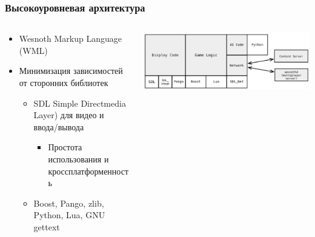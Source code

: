 \documentclass[xetex,mathserif,serif]{beamer}
\begin{document}
	\begin{frame}
		\frametitle{Высокоуровневая архитектура}
		\begin{columns}
			\begin{column}{0.6\textwidth}
				\begin{itemize}
					\item Wesnoth Markup Language (WML)
					\item Минимизация зависимостей от сторонних библиотек
					\begin{itemize}
						\item SDL Simple Directmedia Layer) для видео и ввода/вывода
						\begin{itemize}
							\item Простота использования и кроссплатформенность
						\end{itemize}
						\item Boost, Pango, zlib, Python, Lua, GNU gettext
					\end{itemize}
				\end{itemize}
			\end{column}
			\begin{column}{0.4\textwidth}
				\includegraphics[width=\textwidth]{wesnothArchitecture.png}
			\end{column}
		\end{columns}
	\end{frame}
\end{document}
